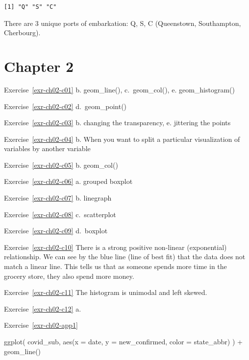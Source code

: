 \documentclass[
  letterpaper,
  DIV=11,
  numbers=noendperiod]{scrreprt}
\newenvironment{Shaded}{\begin{snugshade}}{\end{snugshade}}
\newcommand{\AttributeTok}[1]{\textcolor[rgb]{0.40,0.45,0.13}{#1}}
\newcommand{\FunctionTok}[1]{\textcolor[rgb]{0.28,0.35,0.67}{#1}}
\newcommand{\NormalTok}[1]{\textcolor[rgb]{0.00,0.23,0.31}{#1}}
\newcommand{\SpecialCharTok}[1]{\textcolor[rgb]{0.37,0.37,0.37}{#1}}
\theoremstyle{definition}
\theoremstyle{remark}
\begin{document}
\begin{verbatim}
[1] "Q" "S" "C"
\end{verbatim}

There are 3 unique ports of embarkation: Q, S, C (Queenstown,
Southampton, Cherbourg).

\hypertarget{sec-ex02-sol}{%
\section{Chapter 2}\label{sec-ex02-sol}}

Exercise~\ref{exr-ch02-c01} b. geom\_line(), c.~geom\_col(), e.
geom\_histogram()

Exercise~\ref{exr-ch02-c02} d.~geom\_point()

Exercise~\ref{exr-ch02-c03} b. changing the transparency, e. jittering
the points

Exercise~\ref{exr-ch02-c04} b. When you want to split a particular
visualization of variables by another variable

Exercise~\ref{exr-ch02-c05} b. geom\_col()

Exercise~\ref{exr-ch02-c06} a. grouped boxplot

Exercise~\ref{exr-ch02-c07} b. linegraph

Exercise~\ref{exr-ch02-c08} c.~scatterplot

Exercise~\ref{exr-ch02-c09} d.~boxplot

Exercise~\ref{exr-ch02-c10} There is a strong positive non-linear
(exponential) relationship. We can see by the blue line (line of best
fit) that the data does not match a linear line. This tells us that as
someone spends more time in the grocery store, they also spend more
money.

Exercise~\ref{exr-ch02-c11} The histogram is unimodal and left skewed.

Exercise~\ref{exr-ch02-c12} a.

Exercise~\ref{exr-ch02-app1}

\begin{Shaded}
\begin{Highlighting}[]
\FunctionTok{ggplot}\NormalTok{(}
\NormalTok{  covid\_sub, }
  \FunctionTok{aes}\NormalTok{(}\AttributeTok{x =}\NormalTok{ date, }\AttributeTok{y =}\NormalTok{ new\_confirmed, }\AttributeTok{color =}\NormalTok{ state\_abbr)}
\NormalTok{  ) }\SpecialCharTok{+}
  \FunctionTok{geom\_line}\NormalTok{()}
\end{Highlighting}
\end{Shaded}
\end{document}
